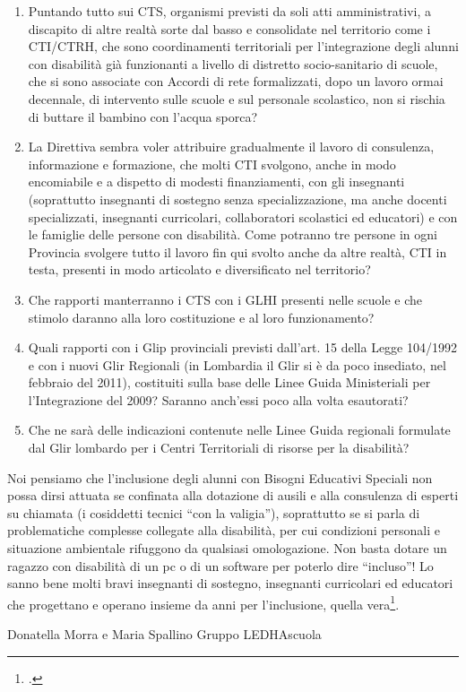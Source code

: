 \begin{enumerate}
	\item Puntando tutto sui CTS, organismi previsti da soli atti amministrativi, a discapito di
	altre realtà sorte dal basso e consolidate nel territorio come i CTI/CTRH, che sono
	coordinamenti territoriali per l'integrazione degli alunni con disabilità già
	funzionanti a livello di distretto socio-sanitario di scuole, che si sono associate con
	Accordi di rete formalizzati, dopo un lavoro ormai decennale, di intervento sulle
	scuole e sul personale scolastico, non si rischia di buttare il bambino con l'acqua
	sporca?
	\item La Direttiva sembra voler attribuire gradualmente il lavoro di consulenza,
	informazione e formazione, che molti CTI svolgono, anche in modo encomiabile e a
	dispetto di modesti finanziamenti, con gli insegnanti (soprattutto insegnanti di
	sostegno senza specializzazione, ma anche docenti specializzati, insegnanti
	curricolari, collaboratori scolastici ed educatori) e con le famiglie delle persone con
	disabilità. Come potranno tre persone in ogni Provincia svolgere tutto il lavoro fin
	qui svolto anche da altre realtà, CTI in testa, presenti in modo articolato e
	diversificato nel territorio?
	\item Che rapporti manterranno i CTS con i GLHI presenti nelle scuole e che stimolo
	daranno alla loro costituzione e al loro funzionamento?
	\item Quali rapporti con i Glip provinciali previsti dall'art. 15 della Legge 104/1992 e con
	i nuovi Glir Regionali (in Lombardia il Glir si è da poco insediato, nel febbraio del
	2011), costituiti sulla base delle Linee Guida Ministeriali per l'Integrazione del
	2009? Saranno anch'essi poco alla volta esautorati?
	\item Che ne sarà delle indicazioni contenute nelle Linee Guida regionali formulate dal
	Glir lombardo per i Centri Territoriali di risorse per la disabilità?
\end{enumerate}
Noi pensiamo che l'inclusione degli alunni con Bisogni Educativi Speciali non possa dirsi attuata
se confinata alla dotazione di ausili e alla consulenza di esperti su chiamata (i cosiddetti tecnici
“con la valigia”), soprattutto se si parla di problematiche complesse collegate alla disabilità, per
cui condizioni personali e situazione ambientale rifuggono da qualsiasi omologazione.
Non basta dotare un ragazzo con disabilità di un pc o di un software per poterlo dire “incluso”!
Lo sanno bene molti bravi insegnanti di sostegno, insegnanti curricolari ed educatori che
progettano e operano insieme da anni per l'inclusione, quella vera\footcite{GruppoLEDHA2013a}.

Donatella Morra e Maria Spallino
Gruppo LEDHAscuola
